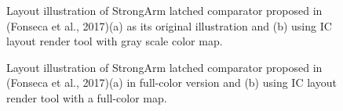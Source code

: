 \documentclass[10pt,a4paper,onecolumn]{article}
\begin{document}
\begin{figure}[ht]
 \begin{center}
   \caption{Layout illustration of StrongArm latched comparator proposed in 
   (Fonseca et al., 2017)(a) as its original illustration and (b) using IC layout render tool with gray scale color map.}
 \end{center}
\end{figure}

\begin{figure}[ht]
 \begin{center}
   \caption{Layout illustration of StrongArm latched comparator proposed in
(Fonseca et al., 2017)(a) in full-color version and (b) using IC
layout render tool with a full-color map.}
 \end{center}
\end{figure}
\end{document}
